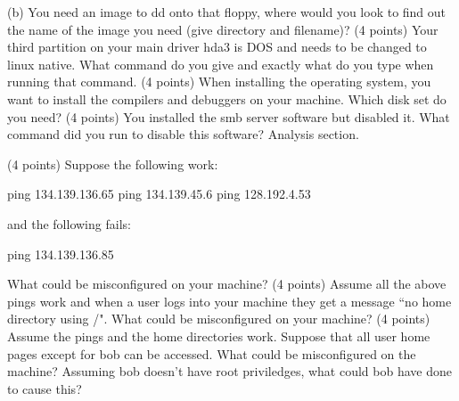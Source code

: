 (b) You need an image to {\ltt{}dd} onto that floppy, where would you
look to find out the name of the image you need (give directory
and filename)?
\vskip 1.3in
\ques
(4 points)
Your third partition on your main driver {\ltt{}hda3} is
DOS and needs to be changed to linux native.
What command do you give and exactly what do you type when
running that command.
\vskip 2.7in
\ques
(4 points)
When installing the operating system, 
you want to install the compilers and debuggers on your machine.
Which disk set do you need?
\vskip 0.5in
\ques
(4 points)
You installed the smb server software but disabled it.
What command did you run to disable this software?
\vskip 0.5in
\vfill\eject
Analysis section. 

\ques
(4 points)
Suppose the following work:

{\program
 ping 134.139.136.65
 ping 134.139.45.6
 ping 128.192.4.53
\endprogram}

and the following fails:

{\program
 ping 134.139.136.85
\endprogram}

What could be misconfigured on your machine?
\vfill
\ques
(4 points)
Assume all the above pings work and when a user logs into your
machine they get a message ``{\ltt{}no home directory using /}".
What could be misconfigured on your machine?
\vfill
\ques
(4 points)
Assume the pings and the home directories work.
Suppose that all user home pages except for {\ltt{}bob} can be accessed.
What could be misconfigured on the machine?
Assuming {\ltt{}bob} doesn't have root priviledges,
what could bob have done to cause this?
\bye
